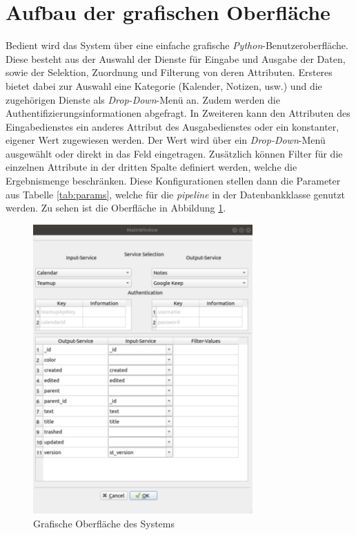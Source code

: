 \newpage
\section{Aufbau der grafischen Oberfläche}

Bedient wird das System über eine einfache grafische \textit{Python}-Benutzeroberfläche. Diese besteht aus der Auswahl der Dienste für Eingabe und Ausgabe der Daten, sowie der Selektion, Zuordnung und Filterung von deren Attributen. Ersteres bietet dabei zur Auswahl eine Kategorie (Kalender, Notizen, usw.) und die zugehörigen Dienste als \textit{Drop-Down}-Menü an. Zudem werden die Authentifizierungsinformationen abgefragt. In Zweiteren kann den Attributen des Eingabedienstes ein anderes Attribut des Ausgabedienstes oder ein konstanter, eigener Wert zugewiesen werden. Der Wert wird über ein \textit{Drop-Down}-Menü ausgewählt oder direkt in das Feld eingetragen. Zusätzlich können Filter für die einzelnen Attribute in der dritten Spalte definiert werden, welche die Ergebnismenge beschränken. Diese Konfigurationen stellen dann die Parameter aus Tabelle \ref{tab:params}, welche für die \textit{pipeline} in der Datenbankklasse genutzt werden. Zu sehen ist die Oberfläche in Abbildung \ref{fig:gui}. 

\begin{figure}[H]
	\centering
	\includegraphics[width=0.75\textwidth]{Bilder/umsetzung/gui.png}
	\caption{Grafische Oberfläche des Systems}
	\label{fig:gui}
\end{figure}